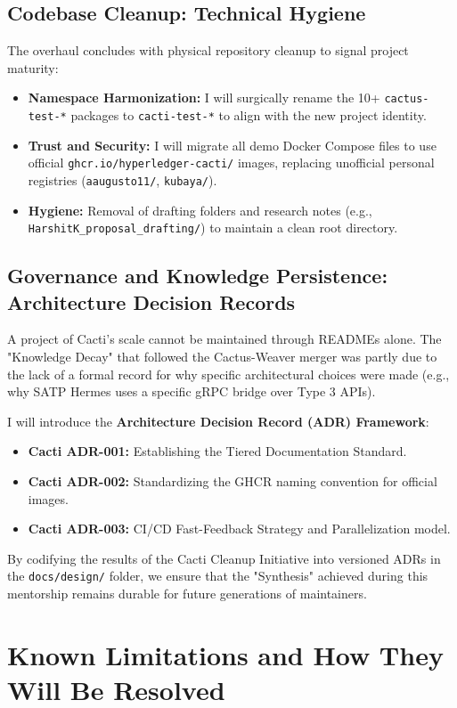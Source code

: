 \subsection{Codebase Cleanup: Technical Hygiene}
The overhaul concludes with physical repository cleanup to signal project maturity:
\begin{itemize}[leftmargin=*]
    \item \textbf{Namespace Harmonization:} I will surgically rename the 10+ \texttt{cactus-test-*} packages to \texttt{cacti-test-*} to align with the new project identity.
    \item \textbf{Trust and Security:} I will migrate all demo Docker Compose files to use official \texttt{ghcr.io/hyperledger-cacti/} images, replacing unofficial personal registries (\texttt{aaugusto11/}, \texttt{kubaya/}).
    \item \textbf{Hygiene:} Removal of drafting folders and research notes (e.g., \texttt{HarshitK\_proposal\_drafting/}) to maintain a clean root directory.
\end{itemize}

\subsection{Governance and Knowledge Persistence: Architecture Decision Records}
A project of Cacti's scale cannot be maintained through READMEs alone. The "Knowledge Decay" that followed the Cactus-Weaver merger was partly due to the lack of a formal record for why specific architectural choices were made (e.g., why SATP Hermes uses a specific gRPC bridge over Type 3 APIs).

I will introduce the \textbf{Architecture Decision Record (ADR) Framework}:
\begin{itemize}[leftmargin=*]
    \item \textbf{Cacti ADR-001:} Establishing the Tiered Documentation Standard.
    \item \textbf{Cacti ADR-002:} Standardizing the GHCR naming convention for official images.
    \item \textbf{Cacti ADR-003:} CI/CD Fast-Feedback Strategy and Parallelization model.
\end{itemize}
By codifying the results of the Cacti Cleanup Initiative into versioned ADRs in the \texttt{docs/design/} folder, we ensure that the "Synthesis" achieved during this mentorship remains durable for future generations of maintainers.

\section{Known Limitations and How They Will Be Resolved}

